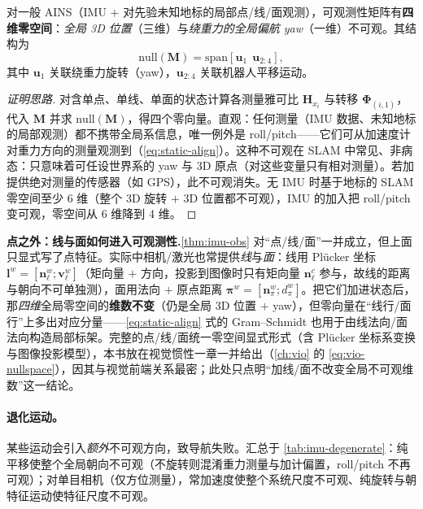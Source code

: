 \begin{theorem}\label{thm:imu-obs}
对一般 AINS（IMU $+$ 对先验未知地标的局部点/线/面观测），可观测性矩阵有\textbf{四维零空间}：\emph{全局 3D 位置}（三维）与\emph{绕重力的全局偏航 yaw}（一维）不可观。其结构为
\[
  \mathrm{null}(\mathbf M)=\mathrm{span}[\boldsymbol u_1\ \ \boldsymbol u_{2:4}],
\]
其中 $\boldsymbol u_1$ 关联绕重力旋转（yaw），$\boldsymbol u_{2:4}$ 关联机器人平移运动\cite{carlone2026handbook}。
\end{theorem}

\begin{proof}[证明思路]
对含单点、单线、单面的状态计算各测量雅可比 $\mathbf H_{x_i}$ 与转移 $\boldsymbol\Phi_{(i,1)}$，代入 $\mathbf M$ 并求 $\mathrm{null}(\mathbf M)$，得四个零向量。直观：任何测量（IMU 数据、未知地标的局部观测）都不携带全局系信息，唯一例外是 roll/pitch——它们可从加速度计对重力方向的测量观测到（\cref{eq:static-align}）。这种不可观在 SLAM 中常见、非病态：只意味着可任设世界系的 yaw 与 3D 原点（对这些变量只有相对测量）。若加提供绝对测量的传感器（如 GPS），此不可观消失。无 IMU 时基于地标的 SLAM 零空间至少 6 维（整个 3D 旋转 $+$ 3D 位置都不可观），IMU 的加入把 roll/pitch 变可观，零空间从 6 维降到 4 维。\cite{carlone2026handbook}
\end{proof}

\begin{note}
\textbf{点之外：线与面如何进入可观测性.}\;\cref{thm:imu-obs} 对“点/线/面”一并成立，但上面只显式写了点特征。实际中相机/激光也常提供\emph{线}与\emph{面}：线用 Plücker 坐标 $\mathbf l^w=[\mathbf n_\ell^w;\mathbf v_\ell^w]$（矩向量 $+$ 方向，投影到图像时只有矩向量 $\mathbf n_\ell^c$ 参与，故线的距离与朝向不可单独测），面用法向 $+$ 原点距离 $\boldsymbol\pi^w=[\mathbf n_\pi^w;d_\pi^w]$。把它们加进状态后，那\emph{四维}全局零空间的\textbf{维数不变}（仍是全局 3D 位置 $+$ yaw），但零向量在“线行/面行”上多出对应分量——\cref{eq:static-align} 式的 Gram--Schmidt 也用于由线法向/面法向构造局部标架。完整的点/线/面统一零空间显式形式（含 Plücker 坐标系变换与图像投影模型），本书放在视觉惯性一章一并给出（\cref{ch:vio} 的 \cref{eq:vio-nullspace}），因其与视觉前端关系最密；此处只点明“加线/面不改变全局不可观维数”这一结论\cite{carlone2026handbook}。
\end{note}

\paragraph{退化运动。}
某些运动会引入\emph{额外}不可观方向，致导航失败。汇总于 \cref{tab:imu-degenerate}：纯平移使整个全局朝向不可观（不旋转则混淆重力测量与加计偏置，roll/pitch 不再可观）；对单目相机（仅方位测量），常加速度使整个系统尺度不可观、纯旋转与朝特征运动使特征尺度不可观\cite{carlone2026handbook}。

